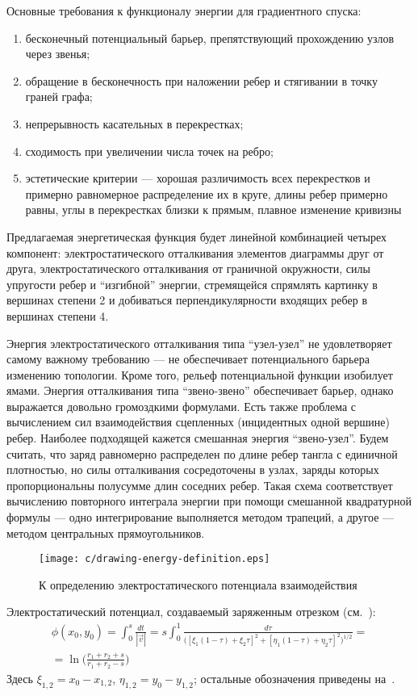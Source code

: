 	Основные требования к функционалу энергии для градиентного спуска:
	\begin{enumerate}
		\item
		бесконечный потенциальный барьер, препятствующий прохождению узлов через звенья;

		\item
		обращение в бесконечность при наложении ребер и стягивании в точку граней графа;

		\item
		непрерывность касательных в перекрестках;

		\item
		сходимость при увеличении числа точек на ребро;

		\item
		эстетические критерии --- хорошая различимость всех перекрестков и примерно равномерное распределение их в круге,
		длины ребер примерно равны, углы в перекрестках близки к прямым, плавное изменение кривизны
	\end{enumerate}

	Предлагаемая энергетическая функция будет линейной комбинацией четырех компонент: электростатического отталкивания элементов
	диаграммы друг от друга, электростатического отталкивания от граничной окружности, силы упругости ребер и ``изгибной''
	энергии, стремящейся спрямлять картинку в вершинах степени 2 и добиваться перпендикулярности входящих ребер в вершинах
	степени 4.

	Энергия электростатического отталкивания типа ``узел-узел'' не удовлетворяет самому важному требованию --- не обеспечивает
	потенциального барьера изменению топологии. Кроме того, рельеф потенциальной функции изобилует ямами. Энергия отталкивания
	типа ``звено-звено'' обеспечивает барьер, однако выражается довольно громоздкими формулами. Есть также проблема с вычислением
	сил взаимодействия сцепленных (инцидентных одной вершине) ребер. Наиболее подходящей кажется смешанная энергия ``звено-узел''.
	Будем считать, что заряд равномерно распределен по длине ребер тангла с единичной плотностью, но силы отталкивания сосредоточены
	в узлах, заряды которых пропорциональны полусумме длин соседних ребер. Такая схема соответствует вычислению повторного интеграла
	энергии при помощи смешанной квадратурной формулы --- одно интегрирование выполняется методом трапеций, а другое --- методом
	центральных прямоугольников.
	\begin{figure}[ht]
		\centering
		\texttt{[image: c/drawing-energy-definition.eps]}
		\caption{К определению электростатического потенциала взаимодействия\label{figure:electrostatic}}
	\end{figure}
	Электростатический потенциал, создаваемый заряженным отрезком (см.~):
	\begin{eqnarray*}
		\phi(x_0, y_0)
		= \int_0^s\frac{dt}{|\vec{v}|}
		= s\int_0^1\frac{d\tau}{\bigl([\xi_1(1-\tau)+\xi_2\tau]^2+[\eta_1(1-\tau)+\eta_2\tau]^2\bigr)^{1/2}} = {}\\
		= \ln\biggl(\frac{r_1+r_2+s}{r_1+r_2-s}\biggr)
	\end{eqnarray*}
	Здесь $\xi_{1,2}=x_0-x_{1,2}$, $\eta_{1,2}=y_0-y_{1,2}$; остальные обозначения приведены на~.

